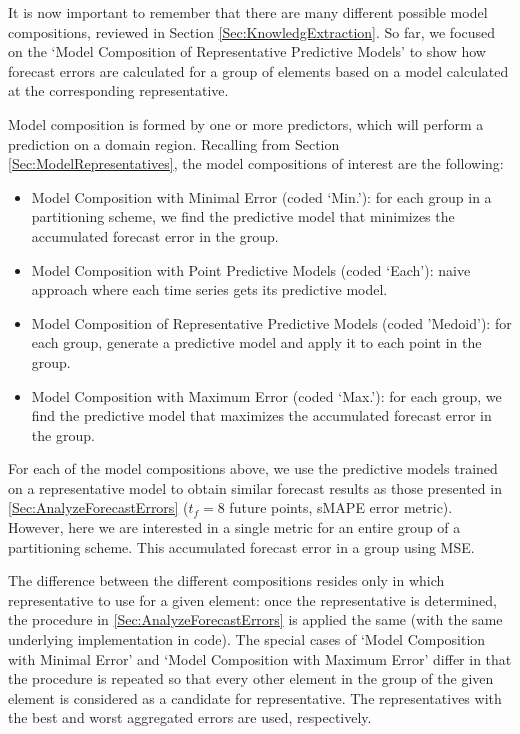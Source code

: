It is now important to remember that there are many different possible model compositions, reviewed in Section \ref{Sec:KnowledgExtraction}. So far, we focused on the `Model Composition of Representative Predictive Models' to show how forecast errors are calculated for a group of elements based on a model calculated at the corresponding representative. 

Model composition is formed by one or more predictors, which will perform a prediction on a domain region. Recalling from Section \ref{Sec:ModelRepresentatives}, the model compositions of interest are the following:

\begin{itemize}%
	\item Model Composition with Minimal Error (coded `Min.'): for each group in a partitioning scheme, we find the predictive model that minimizes the accumulated forecast error in the group. 
	\item Model Composition with Point Predictive Models (coded `Each'): naive approach where each time series gets its predictive model.
	\item Model Composition of Representative Predictive Models (coded 'Medoid'): for each group, generate a predictive model and apply it to each point in the group.
	\item Model Composition with Maximum Error (coded `Max.'): for each group, we find the predictive model that maximizes the accumulated forecast error in the group.
\end{itemize}

For each of the model compositions above, we use the predictive models trained on a representative model to obtain similar forecast results as those presented in \ref{Sec:AnalyzeForecastErrors} ($t_f =8$ future points, sMAPE error metric). However, here we are interested in a single metric for an entire group of a partitioning scheme. This accumulated forecast error in a group using MSE.

The difference between the different compositions resides only in which representative to use for a given element: once the representative is determined, the procedure in \ref{Sec:AnalyzeForecastErrors} is applied the same (with the same underlying implementation in code). The special cases of `Model Composition with Minimal Error' and `Model Composition with Maximum Error' differ in that the procedure is repeated so that every other element in the group of the given element is considered as a candidate for representative. The representatives with the best and worst aggregated errors are used, respectively.

